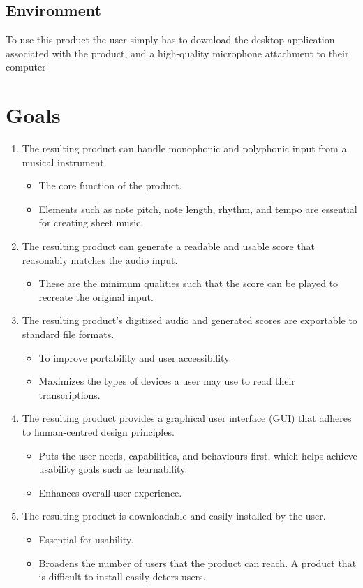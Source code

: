 \documentclass{article}
\begin{document}
\subsection{Environment}
To use this product the user simply has to download the desktop application associated with the product, and a high-quality microphone attachment to their computer

\section{Goals}
\begin{enumerate}
    \item The resulting product can handle monophonic and polyphonic input from a 
    musical instrument.
    \begin{itemize}
        \item The core function of the product.
        \item Elements such as note pitch, note length, rhythm, and tempo are essential 
        for creating sheet music.
    \end{itemize}
    \item The resulting product can generate a readable and usable score that reasonably matches the 
    audio input.
        \begin{itemize}
            \item These are the minimum qualities such that the score can be played to recreate the 
            original input.
        \end{itemize}
    \item The resulting product's digitized audio and generated scores are exportable to standard file 
    formats.
    \begin{itemize}
        \item To improve portability and user accessibility.
        \item Maximizes the types of devices a user may use to read their transcriptions.
    \end{itemize}
    \item The resulting product provides a graphical user interface (GUI) that adheres to 
    human-centred design principles.
    \begin{itemize}
        \item Puts the user needs, capabilities, and behaviours first, which helps achieve 
        usability goals such as learnability.
        \item Enhances overall user experience.
    \end{itemize}
    \item The resulting product is downloadable and easily installed by the user.
    \begin{itemize}
        \item Essential for usability.
        \item Broadens the number of users that the product can reach. A product that is difficult
        to install easily deters users.
    \end{itemize}
\end{enumerate}
\end{document}
